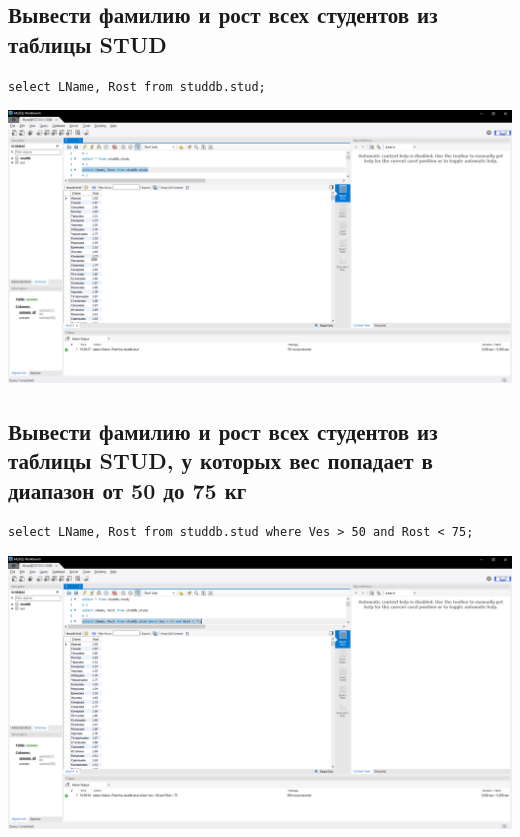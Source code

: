 \documentclass[a4paper, 12pt]{article}
\begin{document}
\subsection{Вывести фамилию и рост всех студентов из таблицы STUD}
\begin{lstlisting}
select LName, Rost from studdb.stud;  
\end{lstlisting}
\includegraphics[width=\textwidth]{5-2.png}

\subsection{Вывести фамилию и рост всех студентов из таблицы STUD, у которых вес попадает в диапазон от 50 до 75 кг}
\begin{lstlisting}
select LName, Rost from studdb.stud where Ves > 50 and Rost < 75;  
\end{lstlisting}
\includegraphics[width=\textwidth]{5-3.png}
\end{document}
